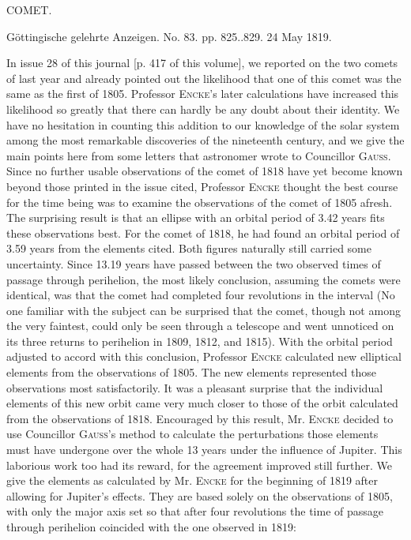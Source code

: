 \clearpage
{}
\begin{center}
\Large COMET.

\medskip
Göttingische gelehrte Anzeigen. No. 83. pp. 825..829. 24 May 1819.
\end{center}

\par\indent In issue 28 of this journal [p. 417 of this volume], we reported on the two comets of last year and already pointed out the likelihood that one of this comet was the same as the first of 1805. Professor \textsc{Encke}’s later calculations have increased this likelihood so greatly that there can hardly be any doubt about their identity. We have no hesitation in counting this addition to our knowledge of the solar system among the most remarkable discoveries of the nineteenth century, and we give the main points here from some letters that astronomer wrote to Councillor \textsc{Gauss}. Since no further usable observations of the comet of 1818 have yet become known beyond those printed in the issue cited, Professor \textsc{Encke} thought the best course for the time being was to examine the observations of the comet of 1805 afresh. The surprising result is that an ellipse with an orbital period of 3.42 years fits these observations best. For the comet of 1818, he had found an orbital period of 3.59 years from the elements cited. Both figures naturally still carried some uncertainty. Since 13.19 years have passed between the two observed times of passage through perihelion, the most likely conclusion, assuming the comets were identical, was that the comet had completed four revolutions in the interval (No one familiar with the subject can be surprised that the comet, though not among the very faintest, could only be seen through a telescope and went unnoticed on its three returns to perihelion in 1809, 1812, and 1815). With the orbital period adjusted to accord with this conclusion, Professor \textsc{Encke} calculated new elliptical elements from the observations of 1805. The new elements represented those observations most satisfactorily. It was a pleasant surprise that the individual elements of this new orbit came very much closer to those of the orbit calculated from the observations of 1818. Encouraged by this result, Mr. \textsc{Encke} decided to use Councillor \textsc{Gauss}’s method to calculate the perturbations those elements must have undergone over the whole 13 years under the influence of Jupiter. This laborious work too had its reward, for the agreement improved still further. We give the elements as calculated by Mr. \textsc{Encke} for the beginning of 1819 after allowing for Jupiter’s effects. They are based solely on the observations of 1805, with only the major axis set so that after four revolutions the time of passage through perihelion coincided with the one observed in 1819:

